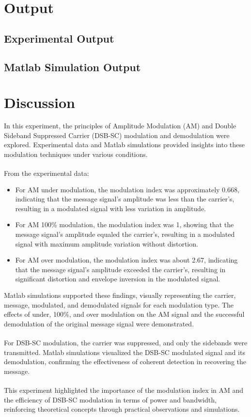 \documentclass[12pt]{article}
\begin{document}
\section*{Output}

\subsection*{Experimental Output}


\subsection*{Matlab Simulation Output}


\section*{Discussion}
In this experiment, the principles of Amplitude Modulation (AM) and Double Sideband Suppressed Carrier (DSB-SC) modulation and demodulation were explored. Experimental data and Matlab simulations provided insights into these modulation techniques under various conditions.
\\\\
From the experimental data:
\begin{itemize}
    \item For AM under modulation, the modulation index was approximately 0.668, indicating that the message signal's amplitude was less than the carrier's, resulting in a modulated signal with less variation in amplitude.
    \item For AM 100\% modulation, the modulation index was 1, showing that the message signal's amplitude equaled the carrier's, resulting in a modulated signal with maximum amplitude variation without distortion.
    \item For AM over modulation, the modulation index was about 2.67, indicating that the message signal's amplitude exceeded the carrier's, resulting in significant distortion and envelope inversion in the modulated signal.
\end{itemize}
Matlab simulations supported these findings, visually representing the carrier, message, modulated, and demodulated signals for each modulation type. The effects of under, 100\%, and over modulation on the AM signal and the successful demodulation of the original message signal were demonstrated.
\\\\
For DSB-SC modulation, the carrier was suppressed, and only the sidebands were transmitted. Matlab simulations visualized the DSB-SC modulated signal and its demodulation, confirming the effectiveness of coherent detection in recovering the message.
\\\\
This experiment highlighted the importance of the modulation index in AM and the efficiency of DSB-SC modulation in terms of power and bandwidth, reinforcing theoretical concepts through practical observations and simulations.
\end{document}
